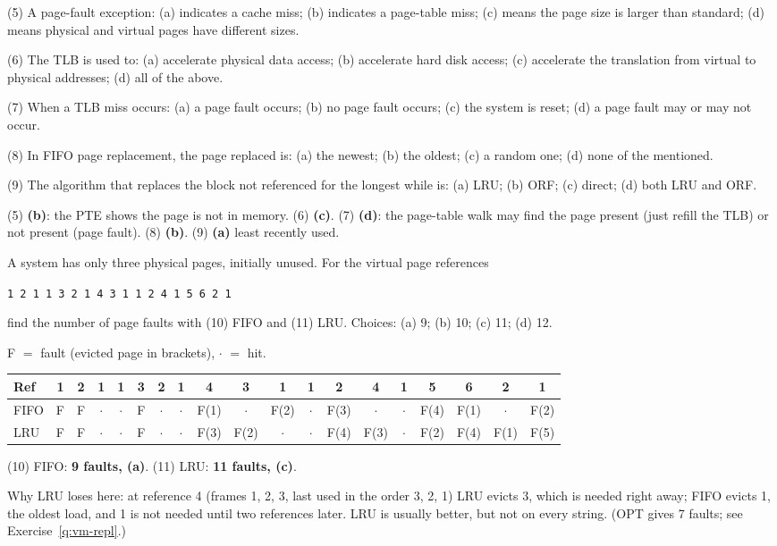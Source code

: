 \begin{exercise}[Lecturer 5--9]
(5) A page-fault exception: (a) indicates a cache miss; (b) indicates a page-table
miss; (c) means the page size is larger than standard; (d) means physical and
virtual pages have different sizes.

(6) The TLB is used to: (a) accelerate physical data access; (b) accelerate hard
disk access; (c) accelerate the translation from virtual to physical addresses;
(d) all of the above.

(7) When a TLB miss occurs: (a) a page fault occurs; (b) no page fault occurs;
(c) the system is reset; (d) a page fault may or may not occur.

(8) In FIFO page replacement, the page replaced is: (a) the newest; (b) the oldest;
(c) a random one; (d) none of the mentioned.

(9) The algorithm that replaces the block not referenced for the longest while is:
(a) LRU; (b) ORF; (c) direct; (d) both LRU and ORF.
\end{exercise}
\begin{solution}
(5) \textbf{(b)}: the PTE shows the page is not in memory.
(6) \textbf{(c)}.
(7) \textbf{(d)}: the page-table walk may find the page present (just refill the TLB)
or not present (page fault).
(8) \textbf{(b)}.
(9) \textbf{(a)} least recently used.
\end{solution}

\begin{exercise}[Lecturer 10--11]\label{l:vm-repl}
A system has only three physical pages, initially unused. For the virtual page
references
\begin{center}
\texttt{1 2 1 1 3 2 1 4 3 1 1 2 4 1 5 6 2 1}
\end{center}
find the number of page faults with (10) FIFO and (11) LRU. Choices: (a) 9; (b) 10;
(c) 11; (d) 12.
\end{exercise}
\begin{solution}
F $=$ fault (evicted page in brackets), $\cdot$ $=$ hit.
\begin{center}
\small
\setlength{\tabcolsep}{2.5pt}
\begin{tabular}{@{}l*{18}{c}@{}}
\toprule
Ref & 1 & 2 & 1 & 1 & 3 & 2 & 1 & 4 & 3 & 1 & 1 & 2 & 4 & 1 & 5 & 6 & 2 & 1 \\
\midrule
FIFO & F & F & $\cdot$ & $\cdot$ & F & $\cdot$ & $\cdot$ & F(1) & $\cdot$ & F(2) & $\cdot$ & F(3) & $\cdot$ & $\cdot$ & F(4) & F(1) & $\cdot$ & F(2) \\
LRU & F & F & $\cdot$ & $\cdot$ & F & $\cdot$ & $\cdot$ & F(3) & F(2) & $\cdot$ & $\cdot$ & F(4) & F(3) & $\cdot$ & F(2) & F(4) & F(1) & F(5) \\
\bottomrule
\end{tabular}
\end{center}
(10) FIFO: \textbf{9 faults, (a)}. (11) LRU: \textbf{11 faults, (c)}.

Why LRU loses here: at reference 4 (frames 1, 2, 3, last used in the order 3, 2, 1)
LRU evicts 3, which is needed right away; FIFO evicts 1, the oldest load, and 1 is
not needed until two references later. LRU is usually better, but not on every
string. (OPT gives 7 faults; see Exercise~\ref{q:vm-repl}.)
\end{solution}

